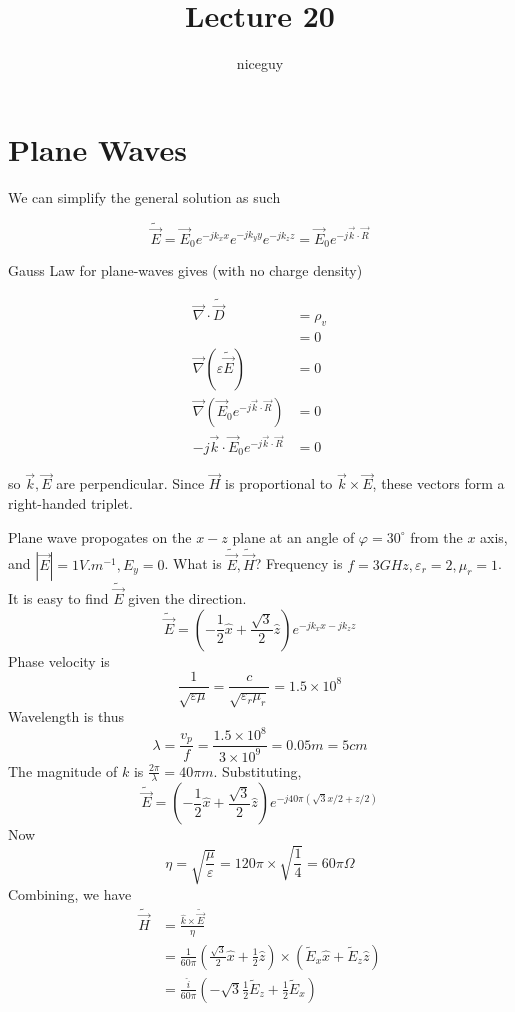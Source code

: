 \documentclass[12pt]{article}
\title{Lecture 20}
\author{niceguy}
\begin{document}
\maketitle

\section{Plane Waves}

We can simplify the general solution as such

$$\tilde{\vec E} = \vec E_0e^{-jk_xx}e^{-jk_yy}e^{-jk_zz} = \vec E_0e^{-j\vec k \cdot \vec R}$$

Gauss Law for plane-waves gives (with no charge density)

\begin{align*}
    \vec\nabla \cdot \tilde{\vec D} &= \rho_v \\
                                  &= 0 \\
    \vec\nabla\left(\varepsilon\tilde{\vec E}\right) &= 0 \\
    \vec\nabla\left(\vec E_0e^{-j\vec k \cdot \vec R}\right) &= 0 \\
    -j\vec k \cdot \vec E_0 e^{-j\vec k \cdot \vec R} &= 0
\end{align*}

so $\vec k, \vec E$ are perpendicular. Since $\vec H$ is proportional to $\vec k \times \vec E$, these vectors form a right-handed triplet.

\begin{ex}
    Plane wave propogates on the $x-z$ plane at an angle of $\varphi = 30^\circ$ from the $x$ axis, and $|\vec E| = 1\unit{V.m^{-1}}, E_y = 0$. What is $\tilde{\vec E}, \tilde{\vec H}$? Frequency is $f = 3\unit{GHz}, \varepsilon_r = 2, \mu_r = 1$. \\
    It is easy to find $\tilde{\vec E}$ given the direction.
    $$\tilde{\vec E} = \left(-\frac{1}{2}\hat x + \frac{\sqrt{3}}{2}\hat z\right) e^{-jk_xx-jk_zz}$$
    Phase velocity is
    $$\frac{1}{\sqrt{\varepsilon\mu}} = \frac{c}{\sqrt{\varepsilon_r\mu_r}} = 1.5 \times 10^8$$
    Wavelength is thus
    $$\lambda = \frac{v_p}{f} = \frac{1.5\times10^8}{3\times10^9} = 0.05\unit{m} = 5\unit{cm}$$
    The magnitude of $k$ is $\frac{2\pi}{\lambda} = 40\pi\unit{m}$. Substituting,
    $$\tilde{\vec E} = \left(-\frac{1}{2}\hat x + \frac{\sqrt{3}}{2}\hat z\right) e^{-j40\pi(\sqrt{3}x/2 + z/2)}$$
    Now
    $$\eta = \sqrt{\frac{\mu}{\varepsilon}} = 120\pi \times \sqrt{\frac{1}{4}} = 60\pi\unit{\Omega}$$
    Combining, we have
    \begin{align*}
        \tilde{\vec H} &= \frac{\hat k \times \tilde{\vec E}}{\eta} \\
                       &= \frac{1}{60\pi} \left(\frac{\sqrt{3}}{2}\hat x + \frac{1}{2}\hat z\right) \times (\tilde E_x\hat x + \tilde E_z\hat z) \\
                       &= \frac{\hat i}{60\pi} \left(-\sqrt{3}\frac{1}{2} \tilde E_z + \frac{1}{2} \tilde E_x\right)
    \end{align*}
\end{ex}
\end{document}
